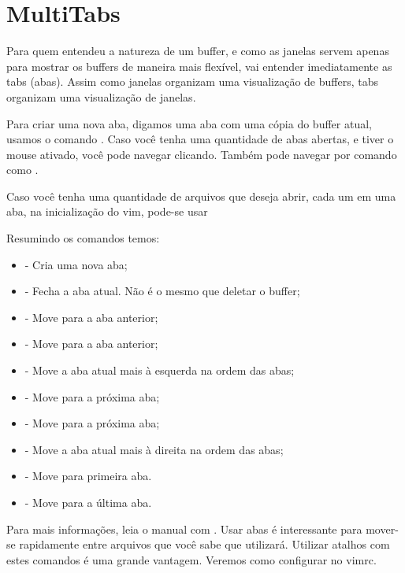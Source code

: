 
\section{MultiTabs}
Para quem entendeu a natureza de um buffer, e como as janelas servem apenas para mostrar os buffers
de maneira mais flexível, vai entender imediatamente as tabs (abas).
Assim como janelas organizam uma visualização de buffers, tabs organizam uma visualização de janelas.

Para criar uma nova aba, digamos uma aba com uma cópia do buffer atual, usamos o comando .
Caso você tenha uma quantidade de abas abertas, e tiver o mouse ativado, você pode navegar clicando.
Também pode navegar por comando como .

Caso você tenha uma quantidade de arquivos que deseja abrir, cada um em uma aba, na inicialização do vim,
pode-se usar 

Resumindo os comandos temos:
\begin{itemize}
    \item {} - Cria uma nova aba;
    \item {} - Fecha a aba atual. Não é o mesmo que deletar o buffer;
    \item {} - Move para a aba anterior;
    \item {} - Move para a aba anterior;
    \item {} - Move a aba atual mais à esquerda na ordem das abas;
    \item {} - Move para a próxima aba;
    \item {} - Move para a próxima aba;
    \item {} - Move a aba atual mais à direita na ordem das abas;
    \item {} - Move para primeira aba.
    \item {} - Move para a última aba.
\end{itemize}


Para mais informações, leia o manual com .
Usar abas é interessante para mover-se rapidamente entre arquivos que você sabe que utilizará.
Utilizar atalhos com estes comandos é uma grande vantagem.
Veremos como configurar no vimrc.

